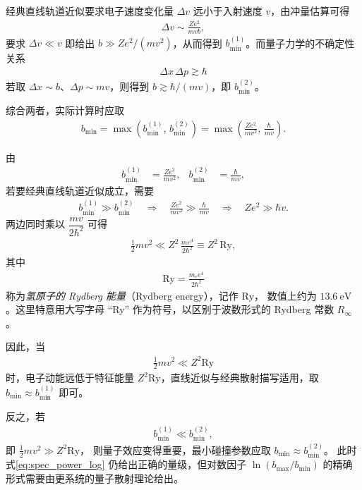 经典直线轨道近似要求电子速度变化量 $\Delta v$ 远小于入射速度 $v$，由冲量估算可得
\begin{align}
  \Delta v \sim \frac{Z e^{2}}{m v b},
\end{align}
要求 $\Delta v \ll v$ 即给出 $b\gg Z e^{2}/(m v^{2})$，从而得到 $b_{\min}^{(1)}$。而量子力学的不确定性关系
\begin{align}
  \Delta x\,\Delta p \gtrsim \hbar
\end{align}
若取 $\Delta x\sim b$、$\Delta p\sim m v$，则得到 $b\gtrsim\hbar/(m v)$，即 $b_{\min}^{(2)}$。

综合两者，实际计算时应取
\begin{align}
  b_{\min}
  = \max\!\left(
      b_{\min}^{(1)},\,
      b_{\min}^{(2)}
    \right)
  = \max\!\left(
      \frac{Z e^{2}}{m v^{2}},\,
      \frac{\hbar}{m v}
    \right).
  \label{eq:bmin_final}
\end{align}

\begin{derivationnote}[经典与量子描写的适用范围]
由
\begin{align}
  b_{\min}^{(1)} &= \frac{Z e^{2}}{m v^{2}}, &
  b_{\min}^{(2)} &= \frac{\hbar}{m v},
\end{align}
若要经典直线轨道近似成立，需要
\begin{align}
  b_{\min}^{(1)} \gg b_{\min}^{(2)}
  \quad\Longrightarrow\quad
  \frac{Z e^{2}}{m v^{2}} \gg \frac{\hbar}{m v}
  \quad\Longrightarrow\quad
  Z e^{2} \gg \hbar v.
\end{align}
两边同时乘以
\(
  \dfrac{m v}{2\hbar^{2}}
\)
可得
\begin{align}
  \frac{1}{2} m v^{2}
  \ll
  Z^{2}\,\frac{m e^{4}}{2\hbar^{2}}
  \equiv Z^{2}\,\mathrm{Ry},
\end{align}
其中
\begin{align}
  \mathrm{Ry}
  = \frac{m_e e^{4}}{2\hbar^{2}}
\end{align}
称为\emph{氢原子的 Rydberg 能量}（Rydberg energy），记作 $\mathrm{Ry}$，
数值上约为 $13.6~\mathrm{eV}$。这里特意用大写字母 ``Ry'' 作为符号，以区别于波数形式的 Rydberg 常数 $R_{\infty}$。

因此，当
\begin{align}
  \frac{1}{2}m v^{2} \ll Z^{2}\mathrm{Ry}
\end{align}
时，电子动能远低于特征能量 $Z^{2}\mathrm{Ry}$，直线近似与经典散射描写适用，取
\(
  b_{\min}\approx b_{\min}^{(1)}
\) 即可。

反之，若
\begin{align}
  b_{\min}^{(1)} \ll b_{\min}^{(2)},
\end{align}
即
\(
  \tfrac{1}{2}m v^{2} \gg Z^{2}\mathrm{Ry}
\)，
则量子效应变得重要，最小碰撞参数应取
\(
  b_{\min}\approx b_{\min}^{(2)}
\)。
此时式\eqref{eq:spec_power_log} 仍给出正确的量级，但对数因子
\(
  \ln(b_{\max}/b_{\min})
\)
的精确形式需要由更系统的量子散射理论给出。
\end{derivationnote}


